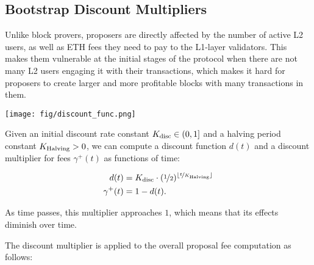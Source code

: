 \subsection{Bootstrap Discount Multipliers}\label{sec:bootstrapping}
Unlike block provers, proposers are directly affected by the number of active L2 users, as well as ETH fees they need to pay to the L1-layer validators. This makes them vulnerable at the initial stages of the protocol when there are not many L2 users engaging it with their transactions, which makes it hard for proposers to create larger and more profitable blocks with many transactions in them.

\begin{Figure}
 \centering
 \texttt{[image: fig/discount\_func.png]}
 \label{fig:discount}
\end{Figure}

Given an initial discount rate constant $K_\textnormal{disc} \in (0, 1]$ and a halving period constant $K_\textnormal{Halving} > 0$, we can compute a discount function $d(t)$ and a discount multiplier for fees $\gamma^+(t)$ as functions of time:

\begin{align}
d(t) &= K_\textnormal{disc}\cdot (\nicefrac{1}{2})^{\lfloor \nicefrac{t}{K_\textnormal{Halving}}\rfloor}
\\
\gamma^+(t)  &= 1-d(t).
\end{align}

As time passes, this multiplier approaches $1$, which means that its effects diminish over time.

The discount multiplier is applied to the overall proposal fee computation as follows:
%
%



